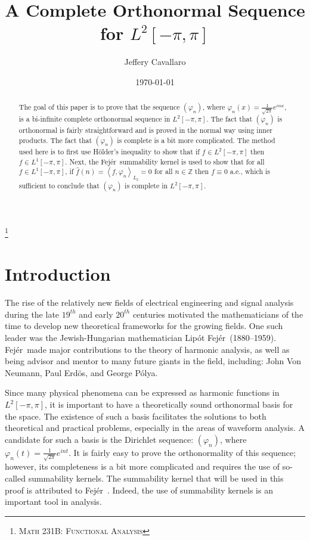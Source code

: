\documentclass[letterpaper,12pt,fleqn,reqno]{amsart}
\theoremstyle{plain}
\newcommand{\Z}{\mathbb{Z}}
\newcommand{\vp}{\varphi}
\newcommand{\Lop}{L^1[-\pi,\pi]}
\newcommand{\Ltp}{L^2[-\pi,\pi]}
\newcommand{\inner}[1]{\left<#1\right>}
\newcommand{\Fej}{Fej\'{e}r\ }
\begin{document}
\title{A Complete Orthonormal Sequence for $\Ltp$}

\author{Jeffery Cavallaro}

\address{Department of Mathematics, San Jos\'e State University, San
  Jos\'e, CA 95192-0103}


\thanks{\textsc{Math 231B: Functional Analysis}}

\date{\today}

\begin{abstract}
  The goal of this paper is to prove that the sequence $(\vp_n)$, where
  $\vp_n(x)=\frac{1}{\sqrt{2\pi}}e^{inx}$, is a bi-infinite complete orthonormal
  sequence in $\Ltp$. The fact that $(\vp_n)$ is orthonormal is fairly
  straightforward and is proved in the normal way using inner products.
  The fact that $(\vp_n)$ is complete is a bit more complicated. The method
  used here is to first use H\"{o}lder's inequality to show that if $f\in\Ltp$
  then $f\in\Lop$. Next, the \Fej summability kernel is used to show that
  for all $f\in\Lop$, if $\hat{f}(n)=\inner{f,\vp_n}_{L_2}=0$ for all $n\in\Z$
  then $f\equiv0$ a.e., which is sufficient to conclude that $(\vp_n)$ is
  complete in $\Ltp$.
\end{abstract}

\maketitle

\section{Introduction}

The rise of the relatively new fields of electrical engineering and signal
analysis during the late $19^{th}$ and early $20^{th}$ centuries motivated the
mathematicians of the time to develop new theoretical frameworks for the
growing fields. One such leader was the Jewish-Hungarian mathematician
Lip\'{o}t \Fej (1880--1959). \Fej made major contributions to the theory
of harmonic analysis, as well as being advisor and mentor to many future giants
in the field, including: John Von Neumann, Paul Erd\"{o}s, and George P\'{o}lya.

Since many physical phenomena can be expressed as harmonic functions in
$L^2[-\pi,\pi]$, it is important to have a theoretically sound orthonormal
basis for the space. The existence of such a basis facilitates the solutions
to both theoretical and practical problems, especially in the areas of
waveform analysis. A candidate for such a basis is the Dirichlet sequence:
$(\vp_n)$, where $\vp_n(t)=\frac{1}{\sqrt{2\pi}}e^{int}$. It is fairly easy
to prove the orthonormality of this sequence; however, its completeness is a
bit more complicated and requires the use of so-called summability kernels.
The summability kernel that will be used in this proof is attributed to
\Fej. Indeed, the use of summability kernels is an important tool in
analysis.
\end{document}
